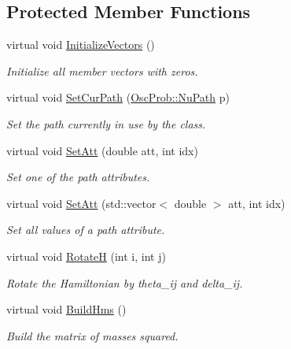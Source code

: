 \subsection*{Protected Member Functions}
\begin{DoxyCompactItemize}
\item 
virtual void \hyperlink{classOscProb_1_1PMNS__Base_adf23b569112f9f9e0e592f01d79a5f3d}{Initialize\+Vectors} ()
\begin{DoxyCompactList}\small\item\em Initialize all member vectors with zeros. \end{DoxyCompactList}\item 
virtual void \hyperlink{classOscProb_1_1PMNS__Base_a986e6ebef09a7e2eb7fee16a4c2c834d}{Set\+Cur\+Path} (\hyperlink{structOscProb_1_1NuPath}{Osc\+Prob\+::\+Nu\+Path} p)
\begin{DoxyCompactList}\small\item\em Set the path currently in use by the class. \end{DoxyCompactList}\item 
virtual void \hyperlink{classOscProb_1_1PMNS__Base_aba565962a440d14bee7a2a96d2eca2c5}{Set\+Att} (double att, int idx)
\begin{DoxyCompactList}\small\item\em Set one of the path attributes. \end{DoxyCompactList}\item 
virtual void \hyperlink{classOscProb_1_1PMNS__Base_aa001479b5f5828c3d16ed087f96ecbcc}{Set\+Att} (std\+::vector$<$ double $>$ att, int idx)
\begin{DoxyCompactList}\small\item\em Set all values of a path attribute. \end{DoxyCompactList}\item 
virtual void \hyperlink{classOscProb_1_1PMNS__Base_aae18afd69074211335f49ec40e6011b9}{RotateH} (int i, int j)
\begin{DoxyCompactList}\small\item\em Rotate the Hamiltonian by theta\+\_\+ij and delta\+\_\+ij. \end{DoxyCompactList}\item 
virtual void \hyperlink{classOscProb_1_1PMNS__Base_ad0faf5eae755afb1baa1fcd5ffebad41}{Build\+Hms} ()
\begin{DoxyCompactList}\small\item\em Build the matrix of masses squared. \end{DoxyCompactList}\item 

\end{DoxyCompactItemize}

